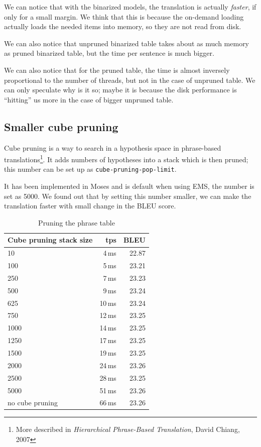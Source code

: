 We can notice that with the binarized models, the translation is actually \emph{faster}, if only for a small margin. We think that this is because the on-demand loading actually loads the needed items into memory, so they are not read from disk.

We can also notice that unpruned binarized table takes about as much memory as pruned binarized table, but the time per sentence is much bigger.

We can also notice that for the pruned table, the time is almost inversely proportional to the number of threads, but not in the case of unpruned table. We can only speculate why is it so; maybe it is because the disk performance is ``hitting'' us more in the case of bigger unpruned table.

\subsection{Smaller cube pruning}
Cube pruning is a way to search in a hypothesis space in phrase-based translations\footnote{More described in \emph{Hierarchical Phrase-Based Translation}, David Chiang, 2007}. It adds numbers of hypotheses into a stack which is then pruned; this number can be set up as \texttt{cube-pruning-pop-limit}.

It has been implemented in Moses and is default when using EMS, the number is set as 5000. We found out that by setting this number smaller, we can make the translation faster with small change in the BLEU score. 

\begin{table}[h]
\begin{center}
\begin{tabular}{|l|r|r|}
    \hline
    \textbf{Cube pruning stack size} &  \textbf{tps} & \textbf{BLEU} \\ \hline
    10 & 4\,ms & 22.87 \\ \hline
    100 & 5\,ms & 23.21 \\ \hline
    250 & 7\,ms & 23.23 \\ \hline
    500 & 9\,ms & 23.24 \\ \hline
    625 & 10\,ms&23.24 \\ \hline
    750 & 12\,ms&23.25\\ \hline
    1000 & 14\,ms & 23.25 \\ \hline
    1250 & 17\,ms & 23.25 \\ \hline
    1500 & 19\,ms & 23.25 \\ \hline
    2000 & 24\,ms & 23.26 \\ \hline
    2500 & 28\,ms & 23.25 \\ \hline
    5000 & 51\,ms & 23.26 \\ \hline
    no cube pruning & 66\,ms & 23.26 \\ \hline
\end{tabular}
\end{center}

\caption{Pruning the phrase table}\label{moses:cubepruning}
\end{table}

